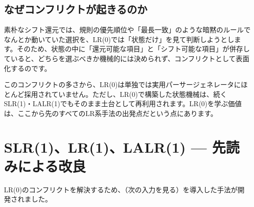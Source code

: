 \subsection{なぜコンフリクトが起きるのか}

素朴なシフト還元では、規則の優先順位や「最長一致」のような暗黙のルールでなんとか動いていた選択を、LR(0)では「状態だけ」を見て判断しようとします。そのため、状態の中に「還元可能な項目」と「シフト可能な項目」が併存していると、どちらを選ぶべきか機械的には決められず、コンフリクトとして表面化するのです。

このコンフリクトの多さから、LR(0)は単独では実用パーサージェネレータにほとんど採用されていません。ただし、LR(0)で構築した状態機械は、続くSLR(1)・LALR(1)でもそのまま土台として再利用されます。LR(0)を学ぶ価値は、ここから先のすべてのLR系手法の出発点だという点にあります。

\section{SLR(1)、LR(1)、LALR(1) --- 先読みによる改良}

LR(0)のコンフリクトを解決するため、（次の入力を見る）を導入した手法が開発されました。

